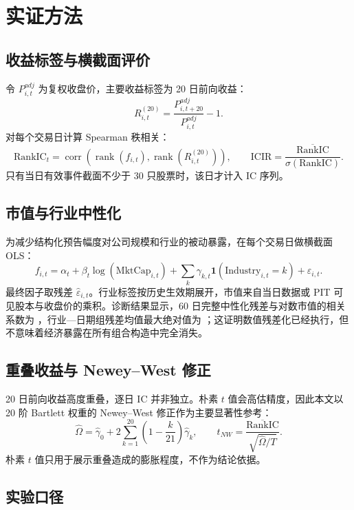\documentclass[UTF8,zihao=-4]{ctexart}
\newcommand{\RankIC}{\mathrm{RankIC}}
\newcommand{\ICIR}{\mathrm{ICIR}}
\DeclareMathOperator{\corr}{corr}
\DeclareMathOperator{\rank}{rank}
\theoremstyle{accentthm}
\begin{document}
\section{实证方法}\label{sec:method}

\subsection{收益标签与横截面评价}

令 $P^{adj}_{i,t}$ 为复权收盘价，主要收益标签为 20 日前向收益：
\[
  R^{(20)}_{i,t}=\frac{P^{adj}_{i,t+20}}{P^{adj}_{i,t}}-1.
\]
对每个交易日计算 Spearman 秩相关：
\[
  \RankIC_t=\corr\!\left(\rank(f_{i,t}),\rank(R^{(20)}_{i,t})\right),
  \qquad
  \ICIR=\frac{\overline{\RankIC}}{\sigma(\RankIC)}.
\]
只有当日有效事件截面不少于 30 只股票时，该日才计入 IC 序列。

\subsection{市值与行业中性化}

为减少结构化预告幅度对公司规模和行业的被动暴露，在每个交易日做横截面 OLS：
\[
  f_{i,t}=\alpha_t+\beta_t\log(\text{MktCap}_{i,t})
  +\sum_k\gamma_{k,t}\mathbf{1}(\text{Industry}_{i,t}=k)+\varepsilon_{i,t}.
\]
最终因子取残差 $\widehat{\varepsilon}_{i,t}$。行业标签按历史生效期展开，市值来自当日数据或 PIT 可见股本与收盘价的乘积。诊断结果显示，60 日完整中性化残差与对数市值的相关系数为 \ResidualSizeCorr，行业—日期组残差均值最大绝对值为 \ResidualIndustryMean；这证明数值残差化已经执行，但不意味着经济暴露在所有组合构造中完全消失。

\subsection{重叠收益与 Newey--West 修正}

20 日前向收益高度重叠，逐日 IC 并非独立。朴素 $t$ 值会高估精度，因此本文以 20 阶 Bartlett 权重的 Newey--West 修正作为主要显著性参考\cite{newey1987}：
\[
  \widehat{\Omega}
  =\widehat{\gamma}_0+
  2\sum_{k=1}^{20}\left(1-\frac{k}{21}\right)\widehat{\gamma}_k,
  \qquad
  t_{NW}=\frac{\overline{\RankIC}}{\sqrt{\widehat{\Omega}/T}}.
\]
朴素 $t$ 值只用于展示重叠造成的膨胀程度，不作为结论依据。

\subsection{实验口径}
\end{document}
